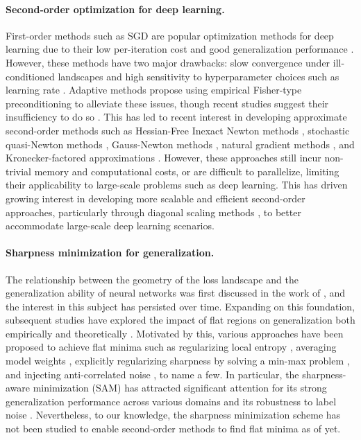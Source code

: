 \paragraph{Second-order optimization for deep learning.}
First-order methods such as SGD are popular optimization methods for deep learning due to their low per-iteration cost and good generalization performance \citep{hardt2016train}.
However, these methods have two major drawbacks: slow convergence under ill-conditioned landscapes and high sensitivity to hyperparameter choices such as learning rate \citep{doi:10.1137/1.9781611976236}.
Adaptive methods \citep{duchi2011adaptive, hinton2012neural, kingma2014adam} propose using empirical Fisher-type preconditioning to alleviate these issues, though recent studies suggest their insufficiency to do so \citep{kunstner2019limitations}.
This has led to recent interest in developing approximate second-order methods such as Hessian-Free Inexact Newton methods \citep{martens2010deep, kiros2013training}, stochastic quasi-Newton methods \citep{byrd2016stochastic, gower2016stochastic}, Gauss-Newton methods \citep{schraudolph2002fast, botev2017practical}, natural gradient methods \citep{amari2000adaptive}, and Kronecker-factored approximations \citep{martens2015optimizing, goldfarb2020practical}.
However, these approaches still incur non-trivial memory and computational costs, or are difficult to parallelize, limiting their applicability to large-scale problems such as deep learning.
This has driven growing interest in developing more scalable and efficient second-order approaches, particularly through diagonal scaling methods \citep{bottou, adahessian, sophia}, to better accommodate large-scale deep learning scenarios.
\vspace{-1em}
\paragraph{Sharpness minimization for generalization.}
The relationship between the geometry of the loss landscape and the generalization ability of neural networks was first discussed in the work of \citet{NIPS1994_Hochreiter}, and the interest in this subject has persisted over time.
Expanding on this foundation, subsequent studies have explored the impact of flat regions on generalization both empirically and theoretically \citep{Hochreiter1997, keskar2016large, DR17, NIPS2017_Neyshabur, dinh17b, 2020Fantastic}. 
Motivated by this, various approaches have been proposed to achieve flat minima such as regularizing local entropy \citep{chaudhari2017entropy}, averaging model weights \citep{izmailov2018averaging}, explicitly regularizing sharpness by solving a min-max problem \citep{sam}, and injecting anti-correlated noise \citep{antipgd_orvieto22a}, to name a few.
In particular, the sharpness-aware minimization (SAM) \citep{sam} has attracted significant attention for its strong generalization performance across various domains \citep{chenvision, bahri2022sharpness, qu2022generalized} and its robustness to label noise \citep{baek2024why}.
Nevertheless, to our knowledge, the sharpness minimization scheme has not been studied to enable second-order methods to find flat minima as of yet.

